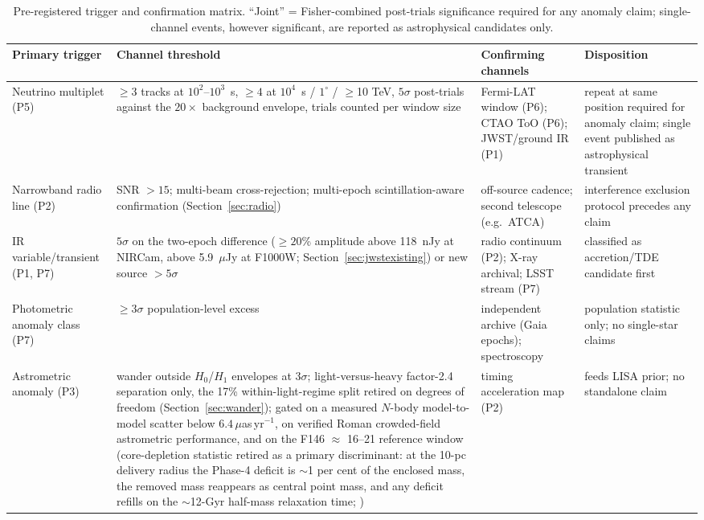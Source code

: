 \documentclass[11pt]{article}
\begin{document}
\begin{table}[tbp]
\centering
\caption{Pre-registered trigger and confirmation matrix. ``Joint'' = Fisher-combined post-trials significance required for any anomaly claim; single-channel events, however significant, are reported as astrophysical candidates only.}
\label{tab:thresholds}
\scriptsize
\begin{tabular}{p{3.4cm}p{2.6cm}p{3.6cm}p{4.0cm}}
\toprule
Primary trigger & Channel threshold & Confirming channels & Disposition \\
\midrule
Neutrino multiplet (P5) & $\geq 3$ tracks at $10^{2}$--$10^{3}$~s, $\geq 4$ at $10^{4}$~s / $1^{\circ}$ / $\geq$10 TeV, $5\sigma$ post-trials against the $20\times$ background envelope, trials counted per window size & Fermi-LAT window (P6); CTAO ToO (P6); JWST/ground IR (P1) & repeat at same position required for anomaly claim; single event published as astrophysical transient \\
Narrowband radio line (P2) & SNR $>15$; multi-beam cross-rejection; multi-epoch scintillation-aware confirmation (Section~\ref{sec:radio}) & off-source cadence; second telescope (e.g.\ ATCA) & interference exclusion protocol precedes any claim \\
IR variable/transient (P1, P7) & $5\sigma$ on the two-epoch difference ($\geq20$\% amplitude above 118~nJy at NIRCam, above 5.9~$\mu$Jy at F1000W; Section~\ref{sec:jwstexisting}) or new source $>5\sigma$ & radio continuum (P2); X-ray archival; LSST stream (P7) & classified as accretion/TDE candidate first \\
Photometric anomaly class (P7) & $\geq 3\sigma$ population-level excess & independent archive (Gaia epochs); spectroscopy & population statistic only; no single-star claims \\
Astrometric anomaly (P3) & wander outside $H_0$/$H_1$ envelopes at $3\sigma$; light-versus-heavy factor-2.4 separation only, the 17\% within-light-regime split retired on degrees of freedom (Section~\ref{sec:wander}); gated on a measured $N$-body model-to-model scatter below $6.4\,\mu$as\,yr$^{-1}$, on verified Roman crowded-field astrometric performance, and on the F146 $\approx$ 16--21 reference window (core-depletion statistic retired as a primary discriminant: at the 10-pc delivery radius the Phase-4 deficit is $\sim$1 per cent of the enclosed mass, the removed mass reappears as central point mass, and any deficit refills on the $\sim$12-Gyr half-mass relaxation time; \citealt{Harris1996,Swanson2026Engineered}) & timing acceleration map (P2) & feeds LISA prior; no standalone claim \\

\end{tabular}
\end{table}
\end{document}
